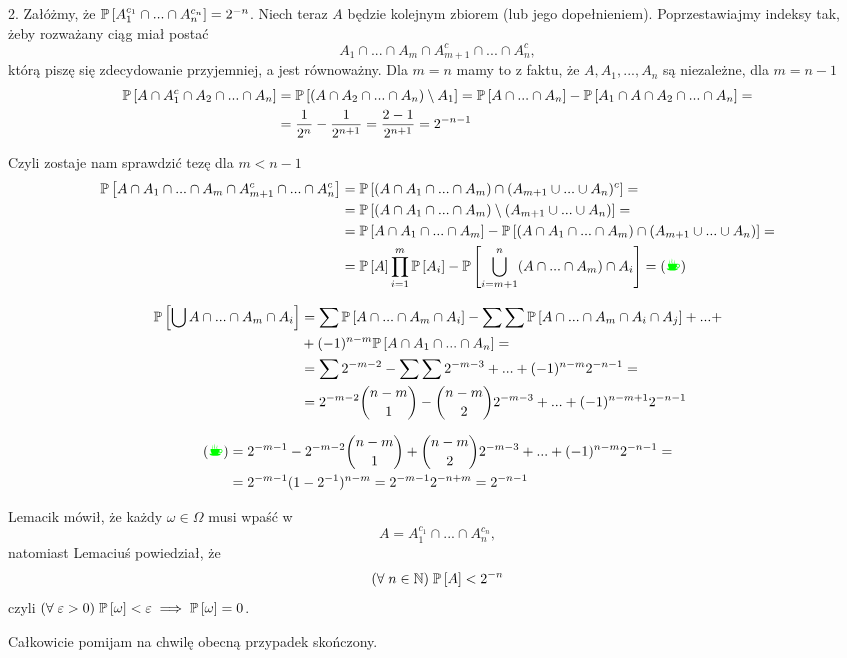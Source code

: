 \documentclass{article}
\begin{document}
2.  Załóżmy, że $\mathbb{P}\left[A_1^{c_1}\cap...\cap A_n^{c_n}\right]=2^{-n}$. Niech teraz $A$ będzie kolejnym zbiorem (lub jego dopełnieniem). Poprzestawiajmy indeksy tak, żeby rozważany ciąg miał postać
$$A_1\cap...\cap A_m\cap A_{m+1}^c\cap...\cap A_n^c,$$
którą piszę się zdecydowanie przyjemniej, a jest równoważny. Dla $m=n$ mamy to z faktu, że $A, A_1,...,A_n$ są niezależne, dla $m=n-1$
\begin{align*}
    \mathbb{P}\left[A\cap A_1^c\cap A_2\cap...\cap A_n\right]&=\mathbb{P}\left[(A\cap A_2\cap...\cap A_n)\setminus A_1\right]=\mathbb{P}\left[A\cap...\cap A_n\right]-\mathbb{P}\left[A_1\cap A\cap A_2\cap...\cap A_n\right]=\\
    &={1\over 2^n}-{1\over 2^{n+1}}={2-1\over 2^{n+1}}=2^{-n-1}
\end{align*}

Czyli zostaje nam sprawdzić tezę dla $m<n-1$
\begin{align*}
    \prawdo{A\cap A_1\cap...\cap A_m\cap A_{m+1}^c\cap...\cap A_n^c}&=\prawdo{(A\cap A_1\cap...\cap A_m)\cap (A_{m+1}\cup...\cup A_n)^c}=\\
    &=\prawdo{(A\cap A_1\cap...\cap A_m)\setminus(A_{m+1}\cup...\cup A_n)}=\\
    &=\prawdo{A\cap A_1\cap ...\cap A_m}-\prawdo{(A\cap A_1\cap...\cap A_m)\cap(A_{m+1}\cup...\cup A_n)}=\\
    &=\prawdo{A}\prod\limits_{i=1}^m\prawdo{A_i}-\prawdo{\bigcup\limits_{i=m+1}^n(A\cap...\cap A_m)\cap A_{i}}=(\coffee)
\end{align*}

\begin{align*}
    \mathbb{P}\left[\bigcup A\cap ...\cap A_m\cap A_i\right]&=\sum \mathbb{P}\left[A\cap...\cap A_m\cap A_i\right]-\sum\sum \mathbb{P}\left[A\cap...\cap A_m\cap A_i\cap A_j\right]+...+\\
    &+(-1)^{n-m}\mathbb{P}\left[A\cap A_1\cap...\cap A_n\right]=\\
    &=\sum 2^{-m-2}-\sum\sum 2^{-m-3}+...+(-1)^{n-m}2^{-n-1}=\\
    &=2^{-m-2}{n-m\choose 1}-{n-m\choose 2}2^{-m-3}+...+(-1)^{n-m+1}2^{-n-1}
\end{align*}

\begin{align*}
    (\coffee)&=2^{-m-1}-2^{-m-2}{n-m\choose 1}+{n-m\choose 2}2^{-m-3}+...+(-1)^{n-m}2^{-n-1}=\\
    &=2^{-m-1}(1-2^{-1})^{n-m}=2^{-m-1}2^{-n+m}=2^{-n-1}
\end{align*}
\bigskip

Lemacik mówił, że każdy $\omega\in\Omega$ musi wpaść w 
$$A=A_1^{c_1}\cap...\cap A_n^{c_n},$$ natomiast Lemaciuś powiedział, że
$$(\forall\;n\in\mathbb{N})\;\mathbb{P}\left[A\right]<2^{-n}$$
czyli $(\forall\;\varepsilon>0)\;\mathbb{P}\left[\omega\right]<\varepsilon\implies\mathbb{P}\left[\omega\right]=0$.

Całkowicie pomijam na chwilę obecną przypadek skończony.

\proofend
\end{document}
